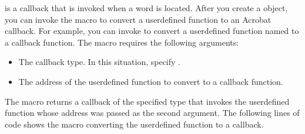 \documentclass[letterpaper,12pt,english,openany,oneside]{sphinxmanual}
\begin{document}
\begin{sphinxVerbatim}[commandchars=\\\{\}]
 
\end{sphinxVerbatim}

 is a callback that is invoked when a word is located. After you create a  object, you can invoke the  macro to convert a user\sphinxhyphen{}defined function to an Acrobat callback. For example, you can invoke  to convert a user\sphinxhyphen{}defined function named  to a callback function. The  macro requires the following arguments:
\begin{itemize}
\item {} 
The callback type. In this situation, specify .

\item {} 
The address of the user\sphinxhyphen{}defined function to convert to a callback function.

\end{itemize}

The  macro returns a callback of the specified type that invokes the user\sphinxhyphen{}defined function whose address was passed as the second argument. The following lines of code shows the  macro converting the  user\sphinxhyphen{}defined function to a  callback.

\begin{sphinxVerbatim}[commandchars=\\\{\}]
  
    
\end{sphinxVerbatim}
\end{document}
